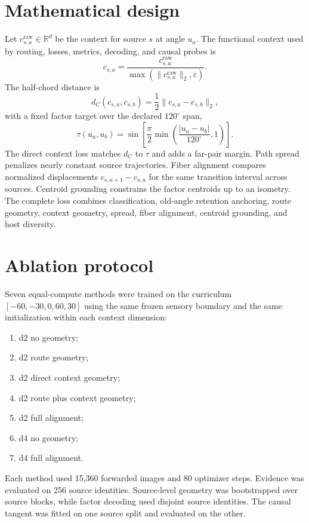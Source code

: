 \documentclass[10pt]{article}
\begin{document}
\section{Mathematical design}
Let $c^{\mathrm{raw}}_{s,a}\in\mathbb R^d$ be the context for source $s$ at angle $u_a$. The functional context used by routing, losses, metrics, decoding, and causal probes is
\begin{equation}
 c_{s,a}=\frac{c^{\mathrm{raw}}_{s,a}}{\max(\|c^{\mathrm{raw}}_{s,a}\|_2,\varepsilon)}.
\end{equation}
The half-chord distance is
\begin{equation}
 d_C(c_{s,a},c_{s,b})=\frac{1}{2}\|c_{s,a}-c_{s,b}\|_2,
\end{equation}
with a fixed factor target over the declared $120^\circ$ span,
\begin{equation}
 \tau(u_a,u_b)=\sin\left[\frac{\pi}{2}\min\left(\frac{|u_a-u_b|}{120^\circ},1\right)\right].
\end{equation}
The direct context loss matches $d_C$ to $\tau$ and adds a far-pair margin. Path spread penalizes nearly constant source trajectories. Fiber alignment compares normalized displacements $c_{s,a+1}-c_{s,a}$ for the same transition interval across sources. Centroid grounding constrains the factor centroids up to an isometry. The complete loss combines classification, old-angle retention anchoring, route geometry, context geometry, spread, fiber alignment, centroid grounding, and host diversity.

\section{Ablation protocol}
Seven equal-compute methods were trained on the curriculum $[-60,-30,0,60,30]$ using the same frozen sensory boundary and the same initialization within each context dimension:
\begin{enumerate}
\item d2 no geometry;
\item d2 route geometry;
\item d2 direct context geometry;
\item d2 route plus context geometry;
\item d2 full alignment;
\item d4 no geometry;
\item d4 full alignment.
\end{enumerate}
Each method used 15,360 forwarded images and 80 optimizer steps. Evidence was evaluated on 256 source identities. Source-level geometry was bootstrapped over source blocks, while factor decoding used disjoint source identities. The causal tangent was fitted on one source split and evaluated on the other.
\end{document}
